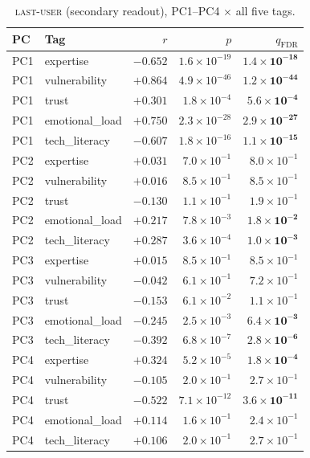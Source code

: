 \documentclass{article}
\newcommand{\lastuser}{\textsc{last-user}}
\begin{document}
\begin{table}[h]
\centering\small
\caption{\lastuser{} (secondary readout), PC1--PC4 $\times$ all five tags.}
\label{tab:interp-last}
\begin{tabular}{llrrr}
\toprule
PC & Tag & $r$ & $p$ & $q_{\text{FDR}}$ \\
\midrule
PC1 & expertise      & $-0.652$ & $1.6\times10^{-19}$ & $\mathbf{1.4\times10^{-18}}$ \\
PC1 & vulnerability  & $+0.864$ & $4.9\times10^{-46}$ & $\mathbf{1.2\times10^{-44}}$ \\
PC1 & trust          & $+0.301$ & $1.8\times10^{-4}$  & $\mathbf{5.6\times10^{-4}}$ \\
PC1 & emotional\_load& $+0.750$ & $2.3\times10^{-28}$ & $\mathbf{2.9\times10^{-27}}$ \\
PC1 & tech\_literacy & $-0.607$ & $1.8\times10^{-16}$ & $\mathbf{1.1\times10^{-15}}$ \\
\midrule
PC2 & expertise      & $+0.031$ & $7.0\times10^{-1}$  & $8.0\times10^{-1}$ \\
PC2 & vulnerability  & $+0.016$ & $8.5\times10^{-1}$  & $8.5\times10^{-1}$ \\
PC2 & trust          & $-0.130$ & $1.1\times10^{-1}$  & $1.9\times10^{-1}$ \\
PC2 & emotional\_load& $+0.217$ & $7.8\times10^{-3}$  & $\mathbf{1.8\times10^{-2}}$ \\
PC2 & tech\_literacy & $+0.287$ & $3.6\times10^{-4}$  & $\mathbf{1.0\times10^{-3}}$ \\
\midrule
PC3 & expertise      & $+0.015$ & $8.5\times10^{-1}$  & $8.5\times10^{-1}$ \\
PC3 & vulnerability  & $-0.042$ & $6.1\times10^{-1}$  & $7.2\times10^{-1}$ \\
PC3 & trust          & $-0.153$ & $6.1\times10^{-2}$  & $1.1\times10^{-1}$ \\
PC3 & emotional\_load& $-0.245$ & $2.5\times10^{-3}$  & $\mathbf{6.4\times10^{-3}}$ \\
PC3 & tech\_literacy & $-0.392$ & $6.8\times10^{-7}$  & $\mathbf{2.8\times10^{-6}}$ \\
\midrule
PC4 & expertise      & $+0.324$ & $5.2\times10^{-5}$  & $\mathbf{1.8\times10^{-4}}$ \\
PC4 & vulnerability  & $-0.105$ & $2.0\times10^{-1}$  & $2.7\times10^{-1}$ \\
PC4 & trust          & $-0.522$ & $7.1\times10^{-12}$ & $\mathbf{3.6\times10^{-11}}$ \\
PC4 & emotional\_load& $+0.114$ & $1.6\times10^{-1}$  & $2.4\times10^{-1}$ \\
PC4 & tech\_literacy & $+0.106$ & $2.0\times10^{-1}$  & $2.7\times10^{-1}$ \\
\bottomrule
\end{tabular}
\end{table}
\end{document}
